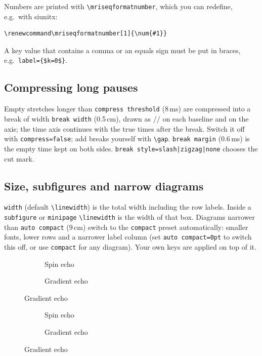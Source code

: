 \documentclass[11pt]{article}
\newcommand\pkg[1]{\textsf{#1}}
\newcommand\cs[1]{\texttt{\textbackslash#1}}
\newcommand\key[1]{\texttt{#1}}
\begin{document}
Numbers are printed with \cs{mriseqformatnumber}, which you can redefine, e.g.\
with \pkg{siunitx}:
\begin{verbatim}
\renewcommand\mriseqformatnumber[1]{\num{#1}}
\end{verbatim}
A key value that contains a comma or an equals sign must be put in braces,
e.g.\ \verb|label={$k=0$}|.

\subsection{Compressing long pauses}
Empty stretches longer than \key{compress threshold} (8\,ms) are compressed
into a break of width \key{break width} (0.5\,cm), drawn as $/\!/$ on each
baseline and on the axis; the time axis continues with the true times after the
break. Switch it off with \key{compress=false}; add breaks yourself with
\cs{gap}. \key{break margin} (0.6\,ms) is the empty time kept on both sides.
\key{break style=slash|zigzag|none} chooses the cut mark.

\subsection{Size, subfigures and narrow diagrams}\label{sec:size}
\key{width} (default \cs{linewidth}) is the total width including the row
labels. Inside a \texttt{subfigure} or \texttt{minipage} \cs{linewidth} is the
width of that box. Diagrams narrower than \key{auto compact} (9\,cm) switch to
the \key{compact} preset automatically: smaller fonts, lower rows and a
narrower label column (set \key{auto compact=0pt} to switch this off, or use
\key{compact} for any diagram). Your own keys are applied on top of it.
\begin{exampleonly}
\begin{figure}
  \begin{subfigure}{0.48\linewidth}
    \SpinEchoDiagram[rows={rf,gz,gy,gx,sig}]
    \caption{Spin echo}
  \end{subfigure}\hfill
  \begin{subfigure}{0.48\linewidth}
    \GradientEchoDiagram[rows={rf,gz,gy,gx,sig}]
    \caption{Gradient echo}
  \end{subfigure}
\end{figure}
\end{exampleonly}
\begin{figure}[h]
  \begin{subfigure}{0.48\linewidth}
    \SpinEchoDiagram[rows={rf,gz,gy,gx,sig}]
    \caption{Spin echo}
  \end{subfigure}\hfill
  \begin{subfigure}{0.48\linewidth}
    \GradientEchoDiagram[rows={rf,gz,gy,gx,sig}]
    \caption{Gradient echo}
  \end{subfigure}
\end{figure}
\end{document}
